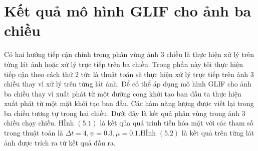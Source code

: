 \documentclass[12pt,oneside,a4]{report}
\begin{document}
\section{Kết quả mô hình GLIF cho ảnh ba chiều}
Có hai hướng tiếp cận chính trong phân vùng ảnh 3 chiều là thực hiện xử lý trên từng lát ảnh hoặc xử lý trực tiếp trên ba chiều. Trong phần này tôi thực hiện tiếp cận theo cách thứ 2 tức là thuật toán sẽ thực hiện xử lý trực tiếp trên ảnh 3 chiều thay vì xử lý trên từng lát ảnh.
Để có thể áp dụng mô hình GLIF cho ảnh ba chiều thay vì xuất phát từ một đường cong khởi tạo ban đầu ta thực hiện xuất phát từ một mặt khởi tạo ban đầu. Các hàm năng lượng được viết lại trong ba chiều tương tự trong hai chiều. Dưới đây là kết quả phân vùng trong ảnh 3 chiều chạy chiều. HÌnh $(5.1)$ là kết qủa quá trình tiến hóa mặt  với các tham số trong thuật toán là $\Delta t=4,\psi=0.3,\mu=0.1 $.HÌnh $(5.2)$ là kết quả trên từng lát ảnh được trích ra từ kết quả đầu ra.
\end{document}
